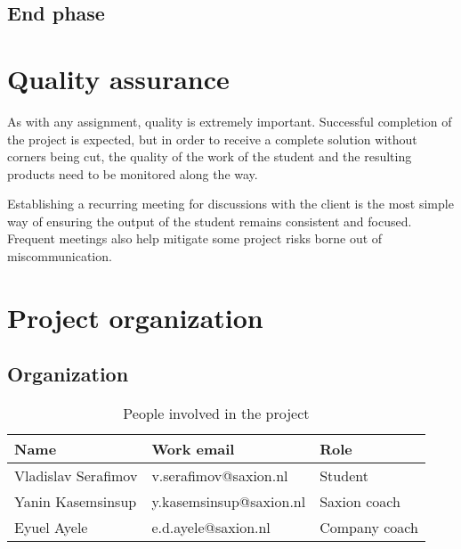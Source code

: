\documentclass{report}
\begin{document}
	\section{End phase}\label{end_phase}
	
	
	
	
	
	\chapter{Quality assurance}\label{quality_assurance}
	As with any assignment, quality is extremely important. Successful completion of the project is expected, but in order to receive a complete solution without corners being cut, the quality of the work of the student and the resulting products need to be monitored along the way.
	
	Establishing a recurring meeting for discussions with the client is the most simple way of ensuring the output of the student remains consistent and focused. Frequent meetings also help mitigate some project risks borne out of miscommunication.
	
	\chapter{Project organization}
	
	\section{Organization}
	
	\begin{table}[h]
		\centering
		\begin{tabular}{|l|l|l|}
			\hline
			Name                & Work email              & Role          \\ \hline
			Vladislav Serafimov & v.serafimov@saxion.nl   & Student       \\ \hline
			Yanin Kasemsinsup   & y.kasemsinsup@saxion.nl & Saxion coach  \\ \hline
			Eyuel Ayele         & e.d.ayele@saxion.nl     & Company coach \\ \hline
		\end{tabular}
		\caption{People involved in the project}
		\label{involved}
	\end{table}
	
\end{document}
